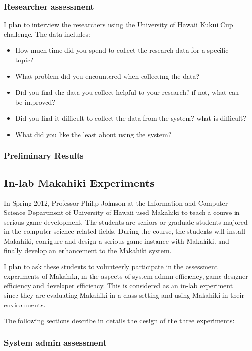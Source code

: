 \subsubsection{Researcher assessment}
I plan to interview the researchers using the University of Hawaii Kukui Cup challenge. The data includes:
\begin{itemize}
\item How much time did you spend to collect the research data for a specific topic?
\item What problem did you encountered when collecting the data?
\item Did you find the data you collect helpful to your research? if not, what can be improved?
\item Did you find it difficult to collect the data from the system? what is difficult?
\item What did you like the least about using the system?
\end{itemize}

\subsubsection{Preliminary Results}

\subsection{In-lab Makahiki Experiments}
In Spring 2012, Professor Philip Johnson at the Information and Computer Science Department of University of Hawaii used Makahiki to teach a course in serious game development. The students are seniors or graduate students majored in the computer science related fields. During the course, the students will install Makahiki, configure and design a serious game instance with Makahiki, and finally develop an enhancement to the Makahiki system.

I plan to ask these students to volunteerly participate in the assessment experiments of Makahiki, in the aspects of system admin efficiency, game designer efficiency and developer efficiency. This is considered as an in-lab experiment since they are evaluating Makahiki in a class setting and using Makahiki in their environments.

The following sections describe in details the design of the three experiments:

\subsubsection{System admin assessment}


